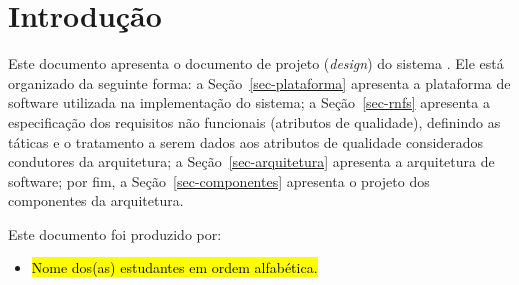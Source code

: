 \chapter{Introdução}
\label{sec-intro}
\vspace{-1cm}

Este documento apresenta o documento de projeto (\textit{design}) do sistema \emph{\imprimirtitulo}. Ele está organizado da seguinte forma: 
	a Seção~\ref{sec-plataforma} apresenta a plataforma de software utilizada na implementação do sistema;
	a Seção~\ref{sec-rnfs} apresenta a especificação dos requisitos não funcionais (atributos de qualidade), definindo as táticas e o tratamento a serem dados aos atributos de qualidade considerados condutores da arquitetura; 
	a Seção~\ref{sec-arquitetura} apresenta a arquitetura de software; por fim, 
	a Seção~\ref{sec-componentes} apresenta o projeto dos componentes da arquitetura.
	

Este documento foi produzido por:
\begin{itemize}
	\item \hl{Nome dos(as) estudantes em ordem alfabética.}
\end{itemize}